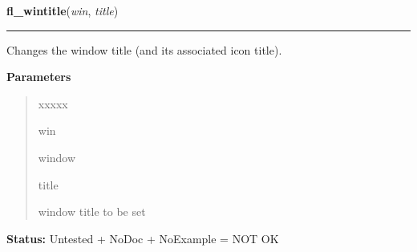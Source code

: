     \label{xformslib:library:fl_wintitle}

    \vspace{0.5ex}

\hspace{.8\funcindent}\begin{boxedminipage}{\funcwidth}

    \raggedright \textbf{fl\_wintitle}(\textit{win}, \textit{title})

    \vspace{-1.5ex}

    \rule{\textwidth}{0.5\fboxrule}
\setlength{\parskip}{2ex}
    Changes the window title (and its associated icon title).

\setlength{\parskip}{1ex}
      \textbf{Parameters}
      \vspace{-1ex}

      \begin{quote}
        \begin{Ventry}{xxxxx}

          \item[win]

          window

          \item[title]

          window title to be set

        \end{Ventry}

      \end{quote}

\textbf{Status:} Untested + NoDoc + NoExample = NOT OK



    \end{boxedminipage}

    \label{xformslib:library:fl_winicontitle}

    \vspace{0.5ex}


